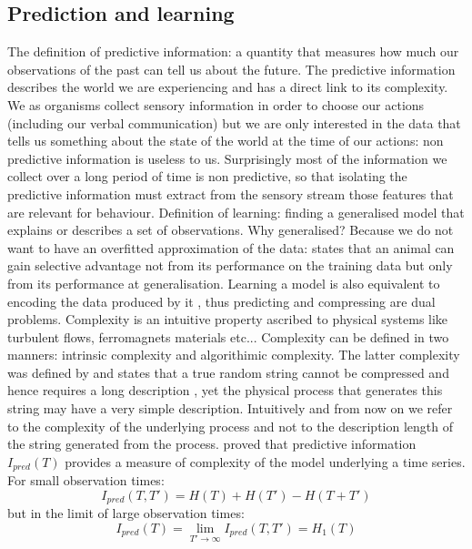 \subsection{Prediction and learning}
\label{Appendix:PredictionAndLearning}
The definition of predictive information: a quantity that measures how much our
observations of the past can tell us about the future. The predictive information
 describes the world we are experiencing and has a direct link to its complexity.
We as organisms collect sensory information in order to choose our actions
(including our verbal communication) but we are only interested in the data
 that tells us something about the state of the world at the time of our actions:
 non predictive information is useless to us. Surprisingly most of the information
 we collect over a long period of time is non predictive, so that isolating the
predictive information must extract from the sensory stream those features that
 are relevant for behaviour.
Definition of learning: finding a generalised model that explains or describes
 a set of observations. Why generalised?
Because we do not want to have an overfitted approximation of the data: \citet{Vapnik1998:StatisticalLearningTheory}
 states that an animal can gain selective advantage not from its performance on the
 training data but only from its performance at generalisation.
Learning a model is also equivalent to encoding the data produced by it \citep{Rissanen1989:Complexity},
thus predicting and compressing are dual problems.
Complexity is an intuitive property ascribed to physical systems like turbulent flows,
ferromagnets materials etc...
Complexity can be defined in two manners: intrinsic complexity and algorithimic complexity.
The latter complexity was defined by and states that a true random string
 cannot be compressed and hence requires a long description \citep{Kolmogorov1965:InfoDefinition}, yet
 the physical process that generates this string may have a very simple description.
Intuitively and from now on we refer to the complexity of the underlying process
 and not to the description length of the string generated from the process.
\citet{Bialek2001:Complexity} proved that predictive information $I_{pred}(T)$ provides
 a measure of complexity of the model underlying a time series. For small observation times:
\begin{equation}
I_{pred}(T,T')=H(T)+H(T')-H(T+T')\label{Ipredgeneral}
\end{equation}
 but in the limit of large observation times:
\begin{equation}
I_{pred}(T)=\lim_{T'\to\infty} I_{pred}(T,T')=H_{1}(T)
\end{equation}
